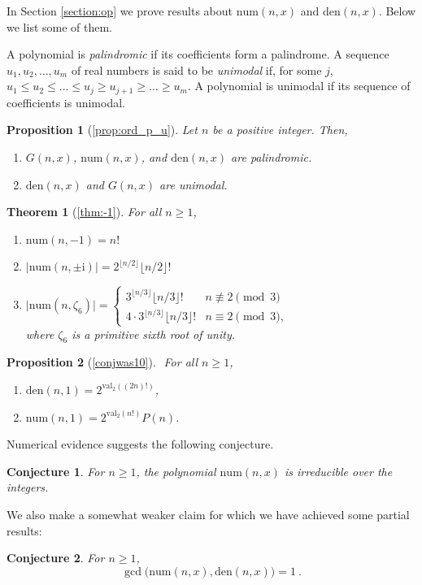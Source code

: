 \documentclass[reqno]{amsart}
\def\den{\mathrm{den}}
\def\num{\mathrm{num}}
\def\val{\mathrm{val}}
\newcommand{\mi}{\mathrm{i}}
\newtheorem{conjecture}{Conjecture}
\newtheorem*{theorem*}{Theorem}
\newtheorem*{proposition*}{Proposition}
\theoremstyle{definition}
\begin{document}
In Section \ref{section:op} we prove results about $\num(n,x)$ and $\den(n,x)$. Below we list some of them. 

A polynomial is  {\it palindromic} if its coefficients  form a palindrome. A sequence $u_1, u_2, \ldots , u_m$ of real numbers is said to be {\it unimodal} if, for some $j$, $u_1 \leq u_2 \leq \ldots \leq u_j \geq u_{j+1} \geq \ldots \geq u_m$. A polynomial is unimodal if its sequence of coefficients is unimodal.

\begin{proposition*}[\ref{prop:ord_p_u}] Let $n$ be a positive integer. Then, 
\begin{enumerate}[label=(\alph*)]
\item    $G(n,x)$, $\num(n,x)$, and $\den(n,x)$ are palindromic. 
 \item  $\den(n,x)$ and $G(n,x)$ are  unimodal.
    \end{enumerate}
\end{proposition*}

\begin{theorem*}[\ref{thm:-1}]
    For all $n\geq 1$, 
        \begin{enumerate} [label=(\alph*)]
        \item $\num(n,-1)=n!$
        \item $\lvert\num(n,\pm\mi)\rvert=2^{\lfloor n/2 
  \rfloor}\lfloor n/2 \rfloor! $
        \item $\lvert\num(n,\zeta_6)\rvert=\begin{cases}
        3^{\lfloor n/3 \rfloor}\lfloor n/3\rfloor !  & n\not\equiv 2 \pmod 3 \\ 4\cdot    3^{\lfloor n/3 \rfloor}\lfloor n/3\rfloor ! & n\equiv 2 \pmod 3,
        \end{cases}$ \\
            where $\zeta_6$ is a primitive sixth root of unity.
    \end{enumerate}
\end{theorem*}

\begin{proposition*}[\ref{conjwas10}]$ $ 
For all $n\geq 1$,
\begin{enumerate}[label=(\alph*)]
    \item   $\den(n,1)=2^{\val_2((2n)!)}$,
    \item  $\num(n,1)=2^{\val_2(n!)}P(n)$.
\end{enumerate}  
\end{proposition*}

Numerical evidence suggests the following conjecture. 
\begin{conjecture}\label{conj:num-irred} For $n\geq 1$, the polynomial $\num(n,x)$ is irreducible over the integers. 
\end{conjecture} 
We also make a somewhat weaker claim for which we have achieved some partial results:
\begin{conjecture}\label{conj:hlambda} For $n\geq 1$,
\[
\gcd\bigl(\num(n,x),\den(n,x)\bigr)=1\:.
\]
\end{conjecture}
\end{document}
